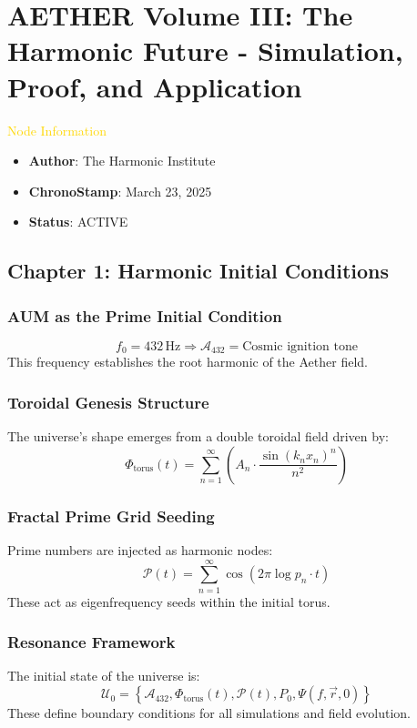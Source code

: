 \section{AETHER Volume III: The Harmonic Future - Simulation, Proof, and Application}
\label{sec:codex_aether_volume_iii}

\textcolor{gold}{ Node Information }
\begin{itemize}
    \item \texttt{} \textbf{Author}: The Harmonic Institute
    \item \texttt{} \textbf{ChronoStamp}: March 23, 2025
    \item \texttt{} \textbf{Status}: ACTIVE
\end{itemize}

\subsection{Chapter 1: Harmonic Initial Conditions}
\subsubsection*{AUM as the Prime Initial Condition}
\[
f_0 = 432 \, \text{Hz} \Rightarrow \mathcal{A}_{432} = \text{Cosmic ignition tone}
\]
This frequency establishes the root harmonic of the Aether field.

\subsubsection*{Toroidal Genesis Structure}
The universe's shape emerges from a double toroidal field driven by:
\[
\Phi_{\text{torus}}(t) = \sum_{n=1}^{\infty} \left( A_n \cdot \frac{\sin \left( k_n x_n \right)^n}{n^2} \right)
\]

\subsubsection*{Fractal Prime Grid Seeding}
Prime numbers are injected as harmonic nodes:
\[
\mathcal{P}(t) = \sum_{n=1}^{\infty} \cos \left( 2 \pi \log p_n \cdot t \right)
\]
These act as eigenfrequency seeds within the initial torus.

\subsubsection*{Resonance Framework}
The initial state of the universe is:
\[
\mathcal{U}_0 = \left\{ \mathcal{A}_{432}, \Phi_{\text{torus}}(t), \mathcal{P}(t), P_0, \Psi(f, \vec{r}, 0) \right\}
\]
These define boundary conditions for all simulations and field evolution.

